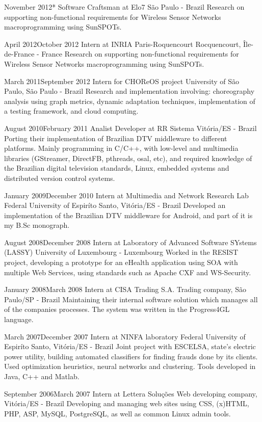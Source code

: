 \documentclass{friggeri-cv}
\begin{document}
\workentry
  {November 2012}{*}
  {Software Craftsman at Elo7}
  {São Paulo - Brazil}
  {Research on supporting non-functional requirements for Wireless Sensor Networks macroprogramming using SunSPOTs.}

\workentry
  {April 2012}{October 2012}
  {Intern at INRIA Paris-Roquencourt}
  {Rocquencourt, Île-de-France - France}
  {Research on supporting non-functional requirements for Wireless Sensor Networks macroprogramming using SunSPOTs.}

\workentry
  {March 2011}{September 2012}
  {Intern for CHOReOS project}
  {University of São Paulo, São Paulo - Brazil}
  {Research and implementation involving: choreography analysis using graph metrics,
  dynamic adaptation techniques, implementation of a testing framework, and cloud computing.}

\workentry
  {August 2010}{February 2011}
  {Analist Developer at RR Sistema}
  {Vitória/ES - Brazil}
  {Porting their implementation of Brazilian DTV middleware to different platforms.
  Mainly programming in C/C++, with low-level and multimedia libraries (GStreamer, DirectFB, pthreads, osal, etc),
  and required knowledge of the Brazilian digital television standards, Linux, embedded systems and
  distributed version control systems.}

\workentry
  {January 2009}{December 2010}
  {Intern at Multimedia and Network Research Lab}
  {Federal University of Espiríto Santo, Vitória/ES - Brazil}
  {Developed an implementation of the Brazilian DTV middleware for Android, and part of it is my B.Sc monograph.}

\workentry
  {August 2008}{December 2008}
  {Intern at Laboratory of Advanced Software SYstems (LASSY)}
  {University of Luxembourg - Luxembourg}
  {Worked in the RESIST project, developing a prototype for an eHealth application using SOA with multiple Web Services,
  using standards such as Apache CXF and WS-Security.}

\workentry
  {January 2008}{March 2008}
  {Intern at CISA Trading S.A.}
  {Trading company, São Paulo/SP - Brazil}
  {Maintaining their internal software solution which manages all of the companies processes.
  The system was written in the Progress4GL language.}

\workentry
  {March 2007}{December 2007}
  {Intern at NINFA laboratory}
  {Federal University of Espiríto Santo, Vitória/ES - Brazil}
  {Joint project with ESCELSA, state's electric power utility, building automated classifiers
  for finding frauds done by its clients. Used optimization heuristics, neural networks and clustering.
  Tools developed in Java, C++ and Matlab.}

\workentry
  {September 2006}{March 2007}
  {Intern at Lettera Soluções}
  {Web developing company, Vitória/ES - Brazil}
  {Developing and managing web sites using CSS, (x)HTML, PHP, ASP, MySQL, PostgreSQL, as well as common Linux admin tools.}


\end{document}
